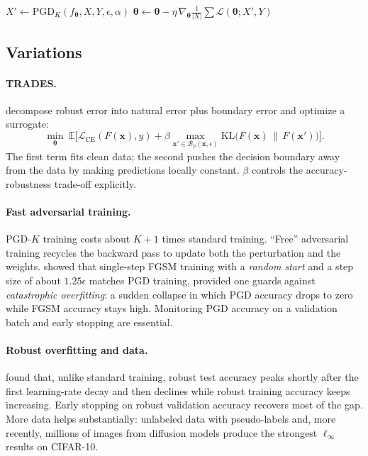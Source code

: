 \documentclass[10pt,a4paper]{extarticle}
\theoremstyle{definition}
\newcommand{\Loss}{\mathcal{L}}
\newcommand{\x}{\mathbf{x}}
\newcommand{\xadv}{\mathbf{x}'}
\newcommand{\btheta}{\boldsymbol{\theta}}
\newcommand{\B}{\mathcal{B}}
\begin{document}
\begin{algorithm}[h]
\caption{PGD adversarial training (one epoch)}
\begin{algorithmic}[1]
  \State \(X' \gets \mathrm{PGD}_K(f_{\btheta},X,Y,\epsilon,\alpha)\) 
  \State \(\btheta \gets \btheta - \eta\,\nabla_{\btheta}\frac{1}{|X|}\sum\Loss(\btheta;X',Y)\)
\EndFor
\end{algorithmic}
\end{algorithm}

\subsection{Variations}

\paragraph{TRADES.} \citet{zhang2019trades} decompose robust error into natural error plus boundary error and optimize a surrogate:
\begin{equation}\label{eq:trades}
\min_{\btheta}\;\mathbb{E}\Big[\Loss_{\text{CE}}(F(\x),y)+\beta\max_{\xadv\in\B_p(\x,\epsilon)}\mathrm{KL}\big(F(\x)\,\|\,F(\xadv)\big)\Big].
\end{equation}
The first term fits clean data; the second pushes the decision boundary away from the data by making predictions locally constant. \(\beta\) controls the accuracy-robustness trade-off explicitly.

\paragraph{Fast adversarial training.} PGD-\(K\) training costs about \(K+1\) times standard training. \enquote{Free} adversarial training \citep{shafahi2019free} recycles the backward pass to update both the perturbation and the weights. \citet{wong2020fast} showed that single-step FGSM training with a \emph{random start} and a step size of about \(1.25\epsilon\) matches PGD training, provided one guards against \emph{catastrophic overfitting}: a sudden collapse in which PGD accuracy drops to zero while FGSM accuracy stays high. Monitoring PGD accuracy on a validation batch and early stopping are essential.

\paragraph{Robust overfitting and data.} \citet{rice2020overfitting} found that, unlike standard training, robust test accuracy peaks shortly after the first learning-rate decay and then declines while robust training accuracy keeps increasing. Early stopping on robust validation accuracy recovers most of the gap. More data helps substantially: unlabeled data with pseudo-labels \citep{carmon2019unlabeled} and, more recently, millions of images from diffusion models \citep{wang2023better} produce the strongest \(\ell_\infty\) results on CIFAR-10.
\end{document}
